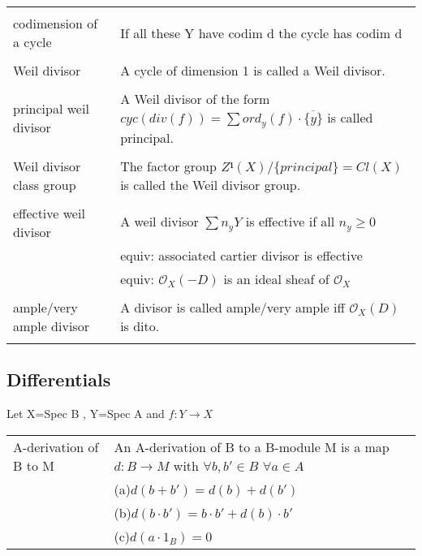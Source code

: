 \documentclass[a4paper, 12pt]{article}
\newcommand{\ox}{\mathcal{O}_X}
\begin{document}
\begin{longtable}{p{}  p{} }
    &\\

    codimension of a cycle & If all these Y have codim d the cycle has codim d\\

    &\\

    Weil divisor & A cycle of dimension 1 is called a Weil divisor.\\

    &\\
    
  



	principal weil divisor & A Weil divisor of the form $cyc(div(f)) = \sum ord_y(f)\cdot\overline{\{y\}}$ is called principal.\\
	
	&\\
	
	Weil divisor class group& The factor group $Z¹(X)/\{principal\} = Cl(X)$ is called the Weil divisor group. \\

	&\\

	effective weil divisor& A weil divisor $\sum n_y Y$ is effective if all $n_y \geq 0$\\
	& equiv: associated cartier divisor is effective\\
	& equiv: $\ox(-D)$ is an ideal sheaf of $\ox$\\
	
	&\\
	
	ample/very ample divisor & A divisor is called ample/very ample iff $\ox(D)$ is dito.\\
	
	&\\
	
		
\end{longtable}


\subsection{Differentials}

Let X=Spec B , Y=Spec A and $f:Y\longrightarrow X$ \\

\begin{tabular}{p{4cm} p{11cm}}


	A-derivation of B to M & An A-derivation of B to a B-module M is a map $d:B\longrightarrow M$ with $\forall b,b'\in B$ $\forall a  \in A$\\
	&(a)$d(b+b')=d(b)+d(b')$\\
	&(b)$d(b\cdot b')= b\cdot b' + d(b)\cdot b'$\\
	&(c)$d(a\cdot 1_B)= 0$\\

  \end{tabular}
\end{document}
